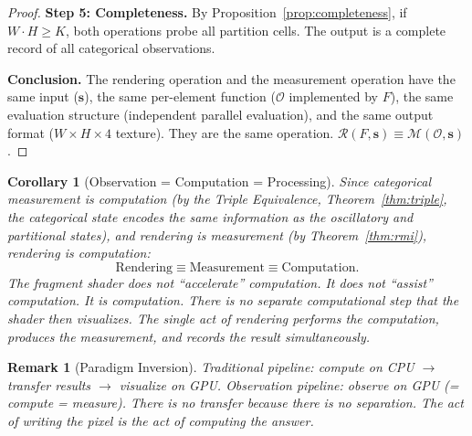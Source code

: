 \documentclass[11pt,twocolumn,a4paper]{article}
\newtheorem{corollary}[theorem]{Corollary}
\newtheorem{remark}[theorem]{Remark}
\newcommand{\Obs}{\mathcal{O}}
\newcommand{\Rend}{\mathcal{R}}
\newcommand{\Meas}{\mathcal{M}}
\begin{document}
\begin{proof}
\textbf{Step 5: Completeness.} By Proposition~\ref{prop:completeness},
if $W \cdot H \geq K$, both operations probe all partition cells.
The output is a complete record of all categorical observations.

\textbf{Conclusion.} The rendering operation and the measurement
operation have the same input ($\bm{s}$), the same per-element
function ($\Obs$ implemented by $F$), the same evaluation structure
(independent parallel evaluation), and the same output format
($W \times H \times 4$ texture). They are the same operation.
$\Rend(F, \bm{s}) \equiv \Meas(\Obs, \bm{s})$. \qedhere
\end{proof}


\begin{corollary}[Observation = Computation = Processing]
\label{cor:obs-comp}
Since categorical measurement \emph{is} computation (by the Triple
Equivalence, Theorem~\ref{thm:triple}, the categorical state encodes
the same information as the oscillatory and partitional states), and
rendering \emph{is} measurement (by Theorem~\ref{thm:rmi}), rendering
\emph{is} computation:
\begin{equation}
\text{Rendering} \equiv \text{Measurement}
  \equiv \text{Computation}.
\label{eq:triple-identity}
\end{equation}
The fragment shader does not ``accelerate'' computation.  It does not
``assist'' computation.  It \emph{is} computation.  There is no
separate computational step that the shader then visualizes.  The
single act of rendering performs the computation, produces the
measurement, and records the result simultaneously.
\end{corollary}

\begin{remark}[Paradigm Inversion]
Traditional pipeline: compute on CPU $\to$ transfer results $\to$
visualize on GPU. Observation pipeline: observe on GPU (= compute
= measure). There is no transfer because there is no separation.
The act of writing the pixel \emph{is} the act of computing the
answer.
\end{remark}


\end{document}
